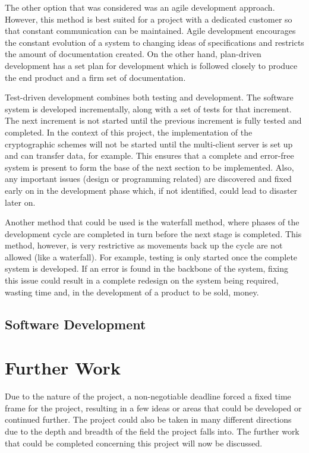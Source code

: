 \documentclass[a4paper,10pt]{report}
\begin{document}
The other option that was considered was an agile development approach. However, this method is best suited for a project with a dedicated customer so that constant communication can be maintained. Agile development encourages the constant evolution of a system to changing ideas of specifications and restricts the amount of documentation created. On the other hand, plan-driven development has a set plan for development which is followed closely to produce the end product and a firm set of documentation. 

Test-driven development combines both testing and development. The software system is developed incrementally, along with a set of tests for that increment. The next increment is not started until the previous increment is fully tested and completed. In the context of this project, the implementation of the cryptographic schemes will not be started until the multi-client server is set up and can transfer data, for example. This ensures that a complete and error-free system is present to form the base of the next section to be implemented. Also, any important issues (design or programming related) are discovered and fixed early on in the development phase which, if not identified, could lead to disaster later on. 

Another method that could be used is the waterfall method, where phases of the development cycle are completed in turn before the next stage is completed. This method, however, is very restrictive as movements back up the cycle are not allowed (like a waterfall). For example, testing is only started once the complete system is developed. If an error is found in the backbone of the system, fixing this issue could result in a complete redesign on the system being required, wasting time and, in the development of a product to be sold, money. 

\section{Software Development}

\chapter{Further Work}

Due to the nature of the project, a non-negotiable deadline forced a fixed time frame for the project, resulting in a few ideas or areas that could be developed or continued further. The project could also be taken in many different directions due to the depth and breadth of the field the project falls into. The further work that could be completed concerning this project will now be discussed. 
\end{document}
